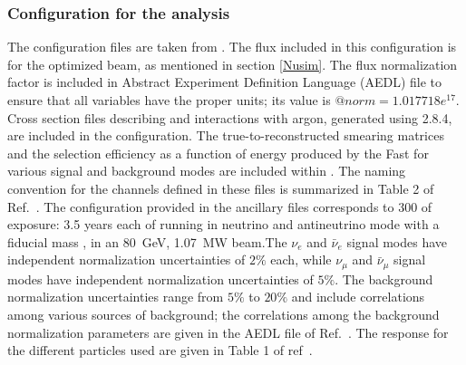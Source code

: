  \subsubsection{  Configuration for the  analysis}
 
The   configuration files are taken from \cite{Alion:2016uaj}.  The flux included in this configuration is for the optimized beam, as mentioned in section \ref{Nusim}. 
 The flux normalization factor is included in    Abstract Experiment Definition Language (AEDL) 
 file to ensure that all variables have the proper units; its value is $@norm = 1.017718e^{17}$. Cross section files describing  and  interactions with argon, generated using  2.8.4, are included in the configuration. The true-to-reconstructed
smearing matrices and the selection efficiency as a function of energy produced by the Fast  for various signal and background modes are included within .
  The naming convention for the channels defined in these files is summarized in Table 2 of Ref.~\cite{Alion:2016uaj}. The   configuration provided in the ancillary files corresponds to \SI{300}{\ktMWyr} of exposure: 3.5 years each of running in neutrino and antineutrino mode 
 with a \fdfiducialmass fiducial mass , in an \SI{80}{GeV}, \SI{1.07}{MW} beam.The $\nu_{e}$ and $\bar\nu_{e}$ signal  modes have independent normalization uncertainties of $2\%$ each, while $\nu_{\mu}$ and $\bar{\nu}_{\mu}$ signal modes have independent normalization uncertainties of $5\%$. The background normalization uncertainties range from $5\%$ to $20\%$ and include
correlations among various sources of background; the correlations among the background normalization
parameters %
are given in the AEDL file of Ref.~\cite{Alion:2016uaj}. The  response for the different particles used %
are given in Table 1 of ref~\cite{Alion:2016uaj}.

